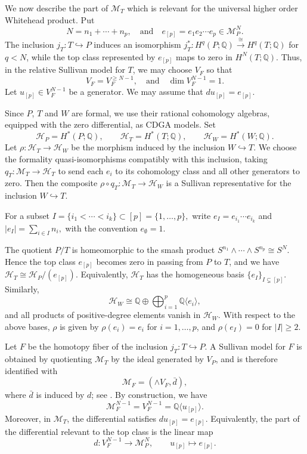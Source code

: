 \documentclass[a4paper,10pt]{amsart}
\theoremstyle{definition}
\theoremstyle{remark}
\numberwithin{equation}{section}
\begin{document}
We now describe the part of $\mathcal M_T$ which is relevant for the universal
higher order Whitehead product. Put
\[
N=n_1+\cdots+n_p,
\quad
\text{and}
\quad
e_{[p]}=e_1e_2\cdots e_p\in \mathcal M_P^N.
\]
The inclusion $j_T:T\hookrightarrow P$ induces an isomorphism
$
j_T^*:H^q(P;\mathbb{Q})\xrightarrow{\cong} H^q(T;\mathbb{Q})
$
 for $q<N$,
while the top class represented by $e_{[p]}$ maps to zero in
$H^N(T;\mathbb{Q})$. Thus, in the relative Sullivan model for $T$, we may
choose $V_F$ so that
\[
V_F=V_F^{\geq N-1},
\quad
\text{and}
\quad
\dim V_F^{N-1}=1.
\]
Let $u_{[p]}\in V_F^{N-1}$ be a generator. We may assume that
$
du_{[p]}=e_{[p]}.
$



Since $P$, $T$ and $W$ are formal, we use their rational cohomology
algebras, equipped with the zero differential, as CDGA models. Set
\[
\mathcal H_P=H^*(P;\mathbb Q),\qquad
\mathcal H_T=H^*(T;\mathbb Q),\qquad
\mathcal H_W=H^*(W;\mathbb Q).
\]
Let
$
\rho:\mathcal H_T \to \mathcal H_W
$
be the morphism induced by the inclusion $W\hookrightarrow T$.
We choose the formality quasi-isomorphisms compatibly with this inclusion,
taking
$q_T :  \mathcal{M}_T \to \mathcal{H}_T$
to send each $e_i$ to its cohomology class and all other generators to zero.
Then the composite
$ \rho\circ q_T : \mathcal{M}_T \to \mathcal{H}_W$
is a Sullivan representative for the inclusion $W\hookrightarrow T$.

For a subset
$
I=\{i_1<\cdots<i_k\}\subset [p]=\{1,\ldots,p\},
$
write
$
e_I=e_{i_1}\cdots e_{i_k}
$
and
$
|e_I|=\sum_{i\in I}n_i,
$
with the convention $e_\emptyset=1$.

The quotient $P/T$ is homeomorphic to the smash product
$
S^{n_1}\wedge\cdots\wedge S^{n_p}
\cong
S^N.
$
Hence the top class $e_{[p]}$ becomes zero in passing from $P$ to $T$, and
we have
$
\mathcal H_T\cong \mathcal H_P/(e_{[p]}).
$
Equivalently, $\mathcal H_T$ has the homogeneous basis
$
\{e_I\}_{I\subsetneq[p]}.
$
Similarly,
\[
\mathcal H_W
\cong
\mathbb{Q}\oplus\bigoplus_{i=1}^p \mathbb{Q} \langle e_i \rangle,
\]
and all products of positive-degree elements vanish in $\mathcal H_W$.
With respect to the above bases, $\rho$ is given by
$
\rho(e_i)=e_i
$
for $i=1,\ldots,p$, and
$
\rho(e_I)=0
$
for $|I|\geq 2$.

Let $F$ be the homotopy fiber of the inclusion $j_T:T\hookrightarrow P$.
A Sullivan model for $F$ is obtained by quotienting $\mathcal M_T$ by
the ideal generated by $V_P$, and is therefore identified with
\[
\mathcal M_F=(\wedge V_F,\bar d),
\]
where $\bar d$ is induced by $d$; see \cite[Theorem 15.3]{FHT}.
By construction, we have
\[
\mathcal M_F^{N-1}=V_F^{N-1}=\mathbb{Q}\langle u_{[p]}\rangle.
\]
Moreover, in $\mathcal M_T$, the differential satisfies
$du_{[p]}=e_{[p]}$.
Equivalently, the part of the differential relevant to the top class is the
linear map
\[
d:V_F^{N-1}\longrightarrow \mathcal M_P^N,
\qquad
u_{[p]}\longmapsto e_{[p]}.
\]
\end{document}
